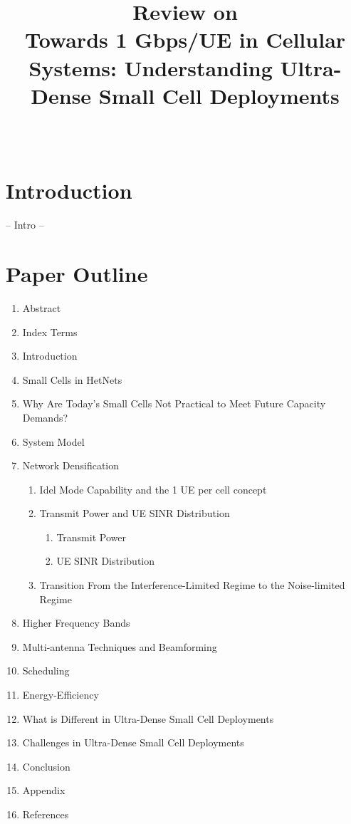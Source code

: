 \documentclass[12pt,onecolumn]{IEEEtran}
\begin{document}
\title{Review on \\ Towards 1 Gbps/UE in Cellular Systems: Understanding Ultra-Dense Small Cell Deployments}
\author{\\
}
\maketitle



\section{Introduction}
\label{sec:intro}

-- Intro --

\section{Paper Outline}
\label{sec:PO}

 \renewcommand{\theenumi}{\Roman{enumi}}
 \begin{enumerate}
   \item Abstract
   \item Index Terms
   \item Introduction
   \item Small Cells in HetNets
   \item Why Are Today's Small Cells Not Practical to Meet Future Capacity Demands?
   \item System Model
   \item Network Densification
   \begin{enumerate}
     \item Idel Mode Capability and the 1 UE per cell concept
     \item Transmit Power and UE SINR Distribution
     \begin{enumerate}
     \item Transmit Power
     \item UE SINR Distribution
     \end{enumerate}
     \item Transition From the Interference-Limited Regime to the Noise-limited Regime
     \end{enumerate}
   \item Higher Frequency Bands
   \item Multi-antenna Techniques and Beamforming
   \item Scheduling
   \item Energy-Efficiency
   \item What is Different in Ultra-Dense Small Cell Deployments
   \item Challenges in Ultra-Dense Small Cell Deployments
   \item Conclusion
   \item Appendix
   \item References
 \end{enumerate}
\end{document}
